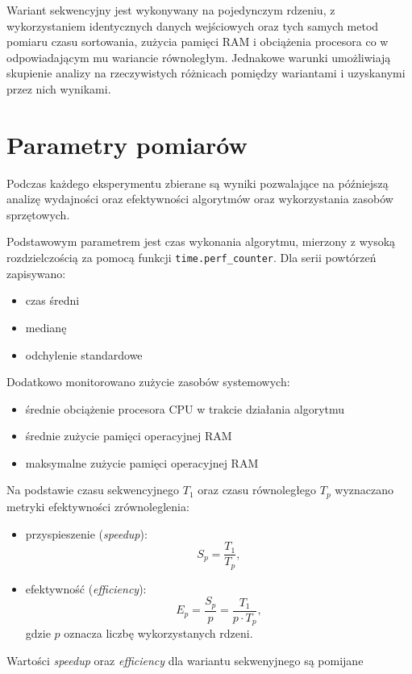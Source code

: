 Wariant sekwencyjny jest wykonywany na pojedynczym rdzeniu, z wykorzystaniem identycznych danych wejściowych oraz tych samych 
metod pomiaru czasu sortowania, zużycia pamięci RAM i obciążenia procesora co w odpowiadającym mu wariancie równoległym. 
Jednakowe warunki umożliwiają skupienie analizy na rzeczywistych różnicach pomiędzy wariantami i uzyskanymi przez nich wynikami.

\section{Parametry pomiarów}
\label{sec:ParametryPomiarow}

Podczas każdego eksperymentu zbierane są wyniki pozwalające na późniejszą analizę wydajności oraz efektywności algorytmów 
oraz wykorzystania zasobów sprzętowych.

Podstawowym parametrem jest czas wykonania algorytmu, mierzony z wysoką rozdzielczością za pomocą funkcji \texttt{time.perf\_counter}. 
Dla serii powtórzeń zapisywano:
\begin{itemize}
    \item czas średni
    \item medianę
    \item odchylenie standardowe
\end{itemize}

Dodatkowo monitorowano zużycie zasobów systemowych:
\begin{itemize}
    \item średnie obciążenie procesora CPU w trakcie działania algorytmu
    \item średnie zużycie pamięci operacyjnej RAM
    \item maksymalne zużycie pamięci operacyjnej RAM
\end{itemize}

Na podstawie czasu sekwencyjnego $T_1$ oraz czasu równoległego $T_p$ 
wyznaczano metryki efektywności zrównoleglenia:
\begin{itemize}
    \item przyspieszenie (\textit{speedup}):
    \[
    S_p = \frac{T_1}{T_p},
    \]
    \item efektywność (\textit{efficiency}):
    \[
    E_p = \frac{S_p}{p} = \frac{T_1}{p \cdot T_p},
    \]
    gdzie $p$ oznacza liczbę wykorzystanych rdzeni.
\end{itemize}

Wartości \textit{speedup} oraz \textit{efficiency} dla wariantu sekwenyjnego są pomijane

